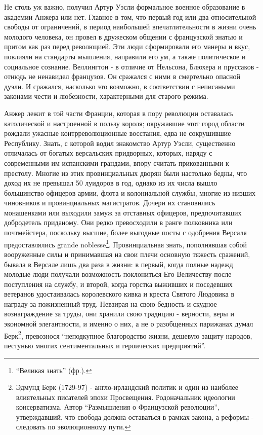 \documentclass[
  oneside,
  12pt,
  titlepage]{book}
\begin{document}
Не столь уж важно, получил Артур Уэсли формальное военное образование в академии Анжера или нет. Главное в том, что первый год или два относительной свободы от ограничений, в период наибольшей впечатлительности в жизни очень молодого человека, он провел в дружеском общении с французской знатью и притом как раз перед революцией. Эти люди сформировали его манеры и вкус, повлияли на стандарты мышления, направили его ум, а также политическое и социальное сознание. Веллингтон - в отличие от Нельсона, Блюхера и пруссаков - отнюдь не ненавидел французов. Он сражался с ними в смертельно опасной дуэли. И сражался, насколько это возможно, в соответствии с неписаными законами чести и любезности, характерными для старого режима.

Анжер лежит в той части Франции, которая в пору революции оставалась католической и настроенной в пользу короля; окружавшие этот город области рождали ужасные контрреволюционные восстания, едва не сокрушившие Республику. Знать, с которой водил знакомство Артур Уэсли, существенно отличалась от богатых версальских придворных, которых, наряду с современными им испанскими грандами, впору считать прикованными к престолу. Многие из этих провинциальных дворян были настолько бедны, что доход их не превышал 50 луидоров в год, однако из их числа вышло большинство офицеров армии, флота и колониальной службы, многие из низших чиновников и провинциальных магистратов. Дочери их становились монашенками или выходили замуж за отставных офицеров, предпочитавших добродетель приданому. Они редко превосходили в ранге полковника или почтмейстера, поскольку высшие, более выгодные посты с одобрения Версаля предоставлялись grande noblesse\footnote{``Великая знать'' (фр.).}. Провинциальная знать, пополнявшая собой вооруженные силы и принимавшая на свои плечи основную тяжесть сражений, бывала в Версале лишь два раза в жизни: в первый, когда полные надежд молодые люди получали возможность поклониться Его Величеству после поступления на службу, и второй, когда горстка выживших и поседевших ветеранов удостаивалась королевского кивка и креста Святого Людовика в награду за пожизненный труд. Невзирая на свою бедность и скудное вознаграждение за труды, они хранили свою традицию - верности, веры и экономной элегантности, и именно о них, а не о разобщенных парижанах думал Берк\footnote{Эдмунд Берк (1729-97) - англо-ирландский политик и один из наиболее влиятельных писателей эпохи Просвещения. Родоначальник идеологии консерватизма. Автор ``Размышления о Французской революции'', утверждавший, что свобода должна оставаться в рамках закона, а реформы - следовать по эволюционному пути.}, превознося ``неподкупное благородство жизни, дешевую защиту народов, пестунью многих сентиментальных и героических предприятий''.
\end{document}
